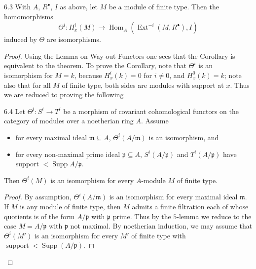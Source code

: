 \begin{bookcorollary}{6.3}\label{cor:5.6.3}
With $A$, $R^\bullet$, $I$ as above, let $M$ be a module of finite type. Then the homomorphisms
\[
\Theta^{i}\colon H_{x}^{i}(M)\longrightarrow \operatorname{Hom}_A(\operatorname{Ext}^{-i}(M,R^{\bullet}), I)
\]
induced by $\Theta$ are isomorphisms.
\end{bookcorollary}

\begin{proof}
Using the Lemma on Way-out Functors  one sees that the Corollary is equivalent to the theorem. To prove the Corollary, note that $\Theta^{i}$ is an isomorphism for $M=k$, because $H_{x}^{i}(k)=0$ for $i\neq0$, and $H_{x}^{0}(k)=k$; note also that for all $M$ of finite type, both sides are modules with support at $x$. Thus we are reduced to proving the following

\begin{booklemma}{6.4}\label{lem:5.6.4}
Let $\Theta^{i}\colon S^{i}\to T^{i}$ be a morphism of covariant cohomological functors on the category of modules over a noetherian ring $A$. Assume
\begin{itemize}
\item[(i)] for every maximal ideal $\mathfrak{m}\subseteq A$, $\Theta^{i}(A/\mathfrak{m})$ is an isomorphism, and
\item[(ii)] for every non-maximal prime ideal $\mathfrak{p}\subseteq A$, $S^{i}(A/\mathfrak{p})$ and $T^{i}(A/\mathfrak{p})$ have support $<\operatorname{Supp}A/\mathfrak{p}$.
\end{itemize}
Then $\Theta^{i}(M)$ is an isomorphism for every $A$-module $M$ of finite type.
\end{booklemma}

\begin{proof}
By assumption, $\Theta^{i}(A/\mathfrak{m})$ is an isomorphism for every maximal ideal $\mathfrak{m}$. If $M$ is any module of finite type, then $M$ admits a finite filtration each of whose quotients is of the form $A/\mathfrak{p}$ with $\mathfrak{p}$ prime. Thus by the $5$-lemma we reduce to the case $M=A/\mathfrak{p}$ with $\mathfrak{p}$ not maximal. By noetherian induction, we may assume that $\Theta^{i}(M')$ is an isomorphism for every $M'$ of finite type with $\operatorname{support}<\operatorname{Supp}(A/\mathfrak{p})$.


\end{proof}
\end{proof}
